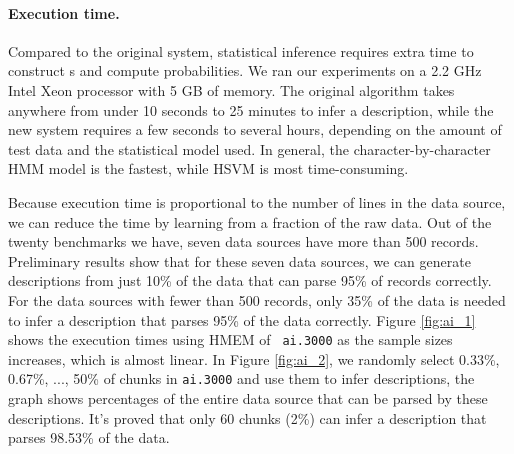 \paragraph*{Execution time.}
Compared to the original system, 
statistical inference requires extra time to construct \seqset{}s and
compute probabilities. 
We ran our experiments on a 2.2 GHz Intel Xeon processor with 5
GB of memory. The original algorithm takes anywhere from 
under 10 seconds to 25 minutes to infer a description, while the new system
requires a few seconds to several hours, depending on the amount of test data
and the statistical model used. In general, the character-by-character
HMM model is the fastest, while HSVM is most time-consuming.

Because execution time is proportional to the
number of lines in the data source, we can reduce the time by
learning from a fraction of the raw data. 
Out of the twenty benchmarks we have, seven data sources
have more than 500 records.  Preliminary results show that for these
seven data sources, we can generate descriptions from just 10\% of the data that can
parse 95\% of records correctly.
For the data sources with fewer than 500 records,
only 35\% of the data is needed to infer a description that parses
95\% of the data correctly.
Figure \ref{fig:ai_1} shows the execution times using HMEM of {\tt
  ai.3000} as the sample sizes increases, which is almost linear. In Figure
\ref{fig:ai_2}, we randomly select 0.33\%, 0.67\%, ..., 50\% of chunks in {\tt ai.3000}
and use them to infer descriptions, the graph shows percentages of the
entire data source that can be parsed by these descriptions. It's
proved that only 60 chunks (2\%) can infer a description that parses 98.53\%
of the data.

